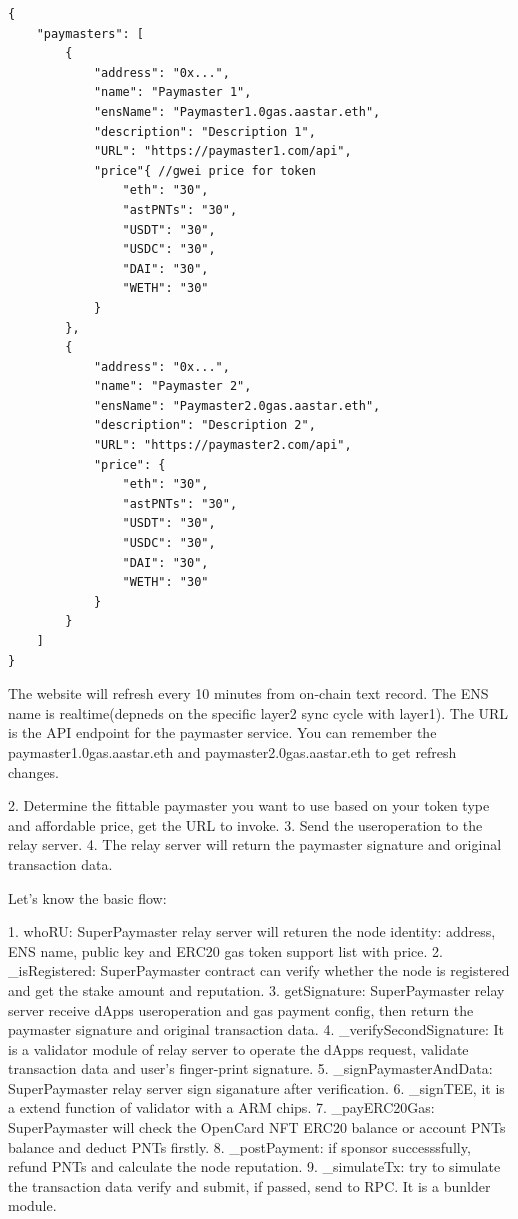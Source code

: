 \documentclass[preprint,12pt]{elsarticle}
\begin{document}
\begin{verbatim}
{
    "paymasters": [
        {
            "address": "0x...",
            "name": "Paymaster 1",
            "ensName": "Paymaster1.0gas.aastar.eth",
            "description": "Description 1",
            "URL": "https://paymaster1.com/api",
            "price"{ //gwei price for token
                "eth": "30",
                "astPNTs": "30",
                "USDT": "30",
                "USDC": "30",
                "DAI": "30",
                "WETH": "30"
            }
        },
        {
            "address": "0x...",
            "name": "Paymaster 2",
            "ensName": "Paymaster2.0gas.aastar.eth",
            "description": "Description 2",
            "URL": "https://paymaster2.com/api",
            "price": {
                "eth": "30",
                "astPNTs": "30",
                "USDT": "30",
                "USDC": "30",
                "DAI": "30",
                "WETH": "30"
            }
        }
    ]
}
\end{verbatim}

The website will refresh every 10 minutes from on-chain text record. The ENS name is realtime(depneds on the specific layer2 sync cycle with layer1). The URL is the API endpoint for the paymaster service. You can remember the paymaster1.0gas.aastar.eth and paymaster2.0gas.aastar.eth to get refresh changes. 

2. Determine the fittable paymaster you want to use based on your token type and affordable price, get the URL to invoke. 
3. Send the useroperation to the relay server. 
4. The relay server will return the paymaster signature and original transaction data.

Let's know the basic flow:

1. whoRU: SuperPaymaster relay server will returen the node identity: address, ENS name, public key and ERC20 gas token support list with price.
2. \_isRegistered: SuperPaymaster contract can verify whether the node is registered and get the stake amount and reputation.
3. getSignature: SuperPaymaster relay server receive dApps useroperation and gas payment config, then return the paymaster signature and original transaction data.
4. \_verifySecondSignature: It is a validator module of relay server to operate the dApps request, validate transaction data and user's finger-print signature.
5. \_signPaymasterAndData: SuperPaymaster relay server sign siganature after verification.
6. \_signTEE, it is a extend function of validator with a ARM chips.
7. \_payERC20Gas: SuperPaymaster will check the OpenCard NFT ERC20 balance or account PNTs balance and deduct PNTs firstly.
8. \_postPayment: if sponsor successsfully, refund PNTs and calculate the node reputation.
9. \_simulateTx: try to simulate the transaction data verify and submit, if passed, send to RPC. It is a bunlder module.
\end{document}
